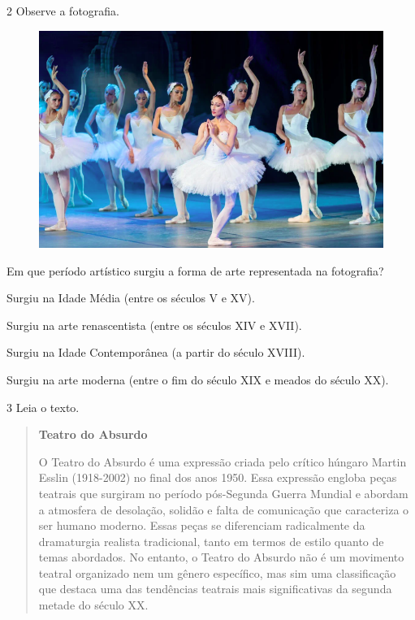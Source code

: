 \pagebreak
\num{2} Observe a fotografia.

\begin{figure}[htpb!]
\includegraphics[width=\textwidth]{./media/image2.png}
\end{figure}

Em que período artístico surgiu a forma de arte representada na fotografia?

\begin{escolha}
\item Surgiu na Idade Média (entre os séculos V e XV).

\item Surgiu na arte renascentista (entre os séculos XIV e XVII).

\item Surgiu na Idade Contemporânea (a partir do século XVIII).

\item Surgiu na arte moderna (entre o fim do século XIX e meados do século XX).
\end{escolha}

\num{3} Leia o texto.

\begin{quote}
\textbf{Teatro do Absurdo}

O Teatro do Absurdo é uma expressão criada pelo crítico húngaro Martin Esslin (1918-2002) 
no final dos anos 1950. Essa expressão engloba peças teatrais que surgiram no período 
pós-Segunda Guerra Mundial e abordam a atmosfera de desolação, solidão e falta de comunicação 
que caracteriza o ser humano moderno. Essas peças se diferenciam radicalmente da dramaturgia 
realista tradicional, tanto em termos de estilo quanto de temas abordados. No entanto, o 
Teatro do Absurdo não é um movimento teatral organizado nem um gênero específico, mas sim uma 
classificação que destaca uma das tendências teatrais mais significativas da segunda metade 
do século XX.

\end{quote}

